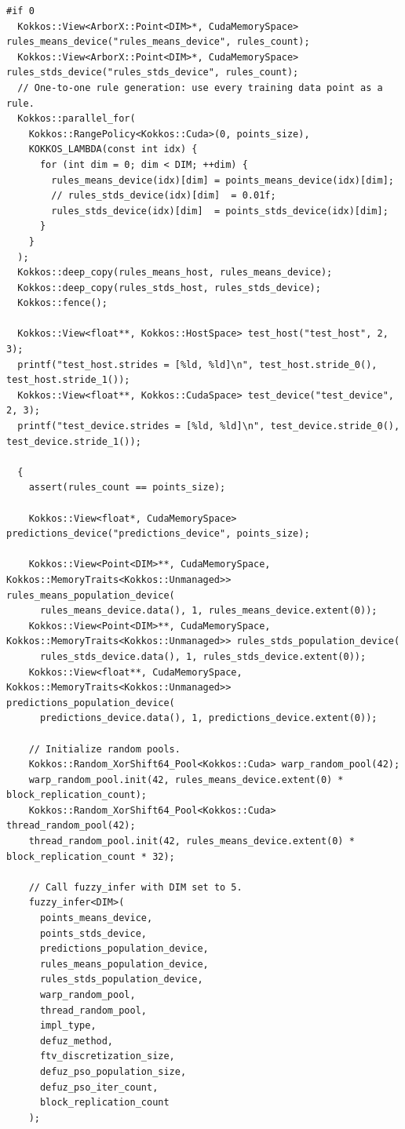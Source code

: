\begin{verbatim}
#if 0
  Kokkos::View<ArborX::Point<DIM>*, CudaMemorySpace> rules_means_device("rules_means_device", rules_count);
  Kokkos::View<ArborX::Point<DIM>*, CudaMemorySpace> rules_stds_device("rules_stds_device", rules_count);
  // One-to-one rule generation: use every training data point as a rule.
  Kokkos::parallel_for(
    Kokkos::RangePolicy<Kokkos::Cuda>(0, points_size),
    KOKKOS_LAMBDA(const int idx) {
      for (int dim = 0; dim < DIM; ++dim) {
        rules_means_device(idx)[dim] = points_means_device(idx)[dim];
        // rules_stds_device(idx)[dim]  = 0.01f;
        rules_stds_device(idx)[dim]  = points_stds_device(idx)[dim];
      }
    }
  );
  Kokkos::deep_copy(rules_means_host, rules_means_device);
  Kokkos::deep_copy(rules_stds_host, rules_stds_device);
  Kokkos::fence();

  Kokkos::View<float**, Kokkos::HostSpace> test_host("test_host", 2, 3);
  printf("test_host.strides = [%ld, %ld]\n", test_host.stride_0(), test_host.stride_1());
  Kokkos::View<float**, Kokkos::CudaSpace> test_device("test_device", 2, 3);
  printf("test_device.strides = [%ld, %ld]\n", test_device.stride_0(), test_device.stride_1());

  {
    assert(rules_count == points_size);

    Kokkos::View<float*, CudaMemorySpace> predictions_device("predictions_device", points_size);

    Kokkos::View<Point<DIM>**, CudaMemorySpace, Kokkos::MemoryTraits<Kokkos::Unmanaged>> rules_means_population_device(
      rules_means_device.data(), 1, rules_means_device.extent(0));
    Kokkos::View<Point<DIM>**, CudaMemorySpace, Kokkos::MemoryTraits<Kokkos::Unmanaged>> rules_stds_population_device(
      rules_stds_device.data(), 1, rules_stds_device.extent(0));
    Kokkos::View<float**, CudaMemorySpace, Kokkos::MemoryTraits<Kokkos::Unmanaged>> predictions_population_device(
      predictions_device.data(), 1, predictions_device.extent(0));

    // Initialize random pools.
    Kokkos::Random_XorShift64_Pool<Kokkos::Cuda> warp_random_pool(42);
    warp_random_pool.init(42, rules_means_device.extent(0) * block_replication_count);
    Kokkos::Random_XorShift64_Pool<Kokkos::Cuda> thread_random_pool(42);
    thread_random_pool.init(42, rules_means_device.extent(0) * block_replication_count * 32);

    // Call fuzzy_infer with DIM set to 5.
    fuzzy_infer<DIM>(
      points_means_device,
      points_stds_device,
      predictions_population_device,
      rules_means_population_device,
      rules_stds_population_device,
      warp_random_pool,
      thread_random_pool,
      impl_type,
      defuz_method,
      ftv_discretization_size,
      defuz_pso_population_size,
      defuz_pso_iter_count,
      block_replication_count
    );


\end{verbatim}
